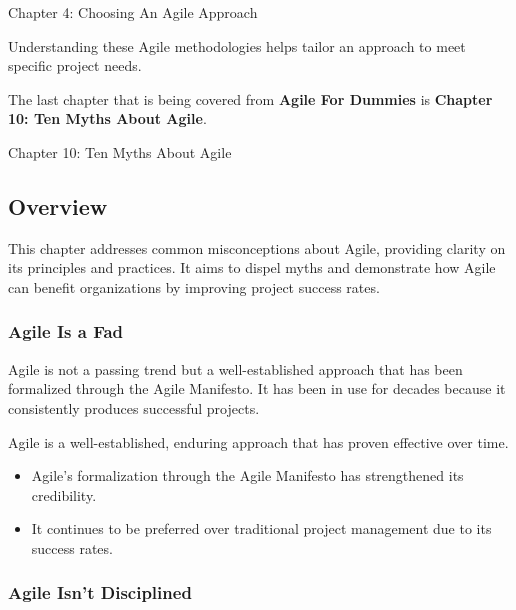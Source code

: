 \begin{notes}{Chapter 4: Choosing An Agile Approach}
\begin{highlight}
        Understanding these Agile methodologies helps tailor an approach to meet specific project needs.
    
    \end{highlight}
\end{notes}

The last chapter that is being covered from \textbf{Agile For Dummies} is \textbf{Chapter 10: Ten Myths About Agile}.

\begin{notes}{Chapter 10: Ten Myths About Agile}
    \subsection*{Overview}

    This chapter addresses common misconceptions about Agile, providing clarity on its principles and practices. It aims to dispel myths and demonstrate how Agile can benefit organizations by improving 
    project success rates.
    
    \subsubsection*{Agile Is a Fad}
    
    Agile is not a passing trend but a well-established approach that has been formalized through the Agile Manifesto. It has been in use for decades because it consistently produces successful projects.
    
    \begin{highlight}
    
        Agile is a well-established, enduring approach that has proven effective over time.
        
        \begin{itemize}
            \item Agile's formalization through the Agile Manifesto has strengthened its credibility.
            \item It continues to be preferred over traditional project management due to its success rates.
        \end{itemize}
    
    \end{highlight}
    
    \subsubsection*{Agile Isn't Disciplined}
    

\end{notes}
